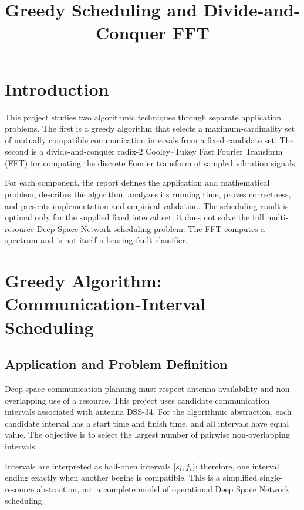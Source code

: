 \documentclass[conference]{IEEEtran}
\title{Greedy Scheduling and Divide-and-Conquer FFT}
\author{
\IEEEauthorblockN{Pradhyuman Singh Shekhawat}
\IEEEauthorblockA{
University of Florida\\
COT5405 --- Analysis of Algorithms\\
Fall 2026
}
}
\begin{document}
\maketitle

\section{Introduction}

This project studies two algorithmic techniques through separate
application problems. The first is a greedy algorithm that selects a
maximum-cardinality set of mutually compatible communication intervals
from a fixed candidate set. The second is a divide-and-conquer radix-2
Cooley--Tukey Fast Fourier Transform (FFT) for computing the discrete
Fourier transform of sampled vibration signals.

For each component, the report defines the application and mathematical
problem, describes the algorithm, analyzes its running time, proves
correctness, and presents implementation and empirical validation.
The scheduling result is optimal only for the supplied fixed interval
set; it does not solve the full multi-resource Deep Space Network
scheduling problem. The FFT computes a spectrum and is not itself a
bearing-fault classifier.

\section{Greedy Algorithm: Communication-Interval Scheduling}

\subsection{Application and Problem Definition}

Deep-space communication planning must respect antenna availability
and non-overlapping use of a resource. This project uses candidate
communication intervals associated with antenna DSS-34. For the
algorithmic abstraction, each candidate interval has a start time and
finish time, and all intervals have equal value. The objective is to
select the largest number of pairwise non-overlapping intervals.

Intervals are interpreted as half-open intervals $[s_i,f_i)$;
therefore, one interval ending exactly when another begins is
compatible. This is a simplified single-resource abstraction, not a
complete model of operational Deep Space Network scheduling.
\end{document}
